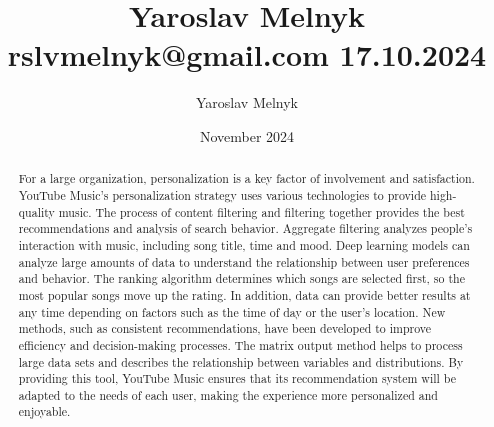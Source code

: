 \documentclass{article}
\title{Yaroslav Melnyk rslvmelnyk@gmail.com 17.10.2024}
\author{Yaroslav Melnyk}
\date{November 2024}
\begin{document}
\maketitle

\begin{abstract}
    For a large organization, personalization is a key factor of
involvement and satisfaction. YouTube Music's personalization
strategy uses various technologies to provide high-quality music.
The process of content filtering and filtering together provides the
best recommendations and analysis of search behavior. Aggregate
filtering analyzes people's interaction with music, including song
title, time and mood.
Deep learning models can analyze large amounts of data to
understand the relationship between user preferences and
behavior. The ranking algorithm determines which songs are
selected first, so the most popular songs move up the rating. In
addition, data can provide better results at any time depending on
factors such as the time of day or the user's location.
New methods, such as consistent recommendations, have been
developed to improve eﬃciency and decision-making processes.
The matrix output method helps to process large data sets and
describes the relationship between variables and distributions.
By providing this tool, YouTube Music ensures that its
recommendation system will be adapted to the needs of each user,
making the experience more personalized and enjoyable.
\end{abstract}
\end{document}
